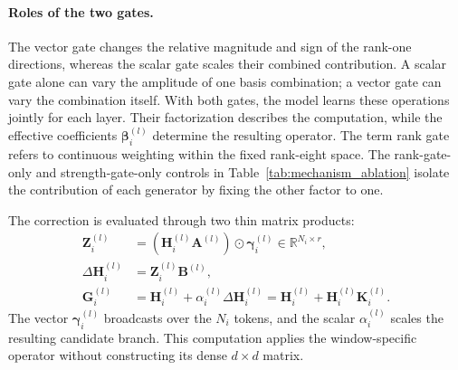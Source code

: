 \documentclass[journal]{IEEEtran}
\begin{document}
\paragraph{Roles of the two gates.}
The vector gate changes the relative magnitude and sign of the rank-one directions, whereas the scalar gate scales their combined contribution. A scalar gate alone can vary the amplitude of one basis combination; a vector gate can vary the combination itself. With both gates, the model learns these operations jointly for each layer. Their factorization describes the computation, while the effective coefficients $\boldsymbol\beta_i^{(l)}$ determine the resulting operator. The term rank gate refers to continuous weighting within the fixed rank-eight space. The rank-gate-only and strength-gate-only controls in Table~\ref{tab:mechanism_ablation} isolate the contribution of each generator by fixing the other factor to one.

The correction is evaluated through two thin matrix products:
\begin{equation}
\label{eq:candidate-correction}
\begin{aligned}
\mathbf Z_i^{(l)}&=(\mathbf H_i^{(l)}\mathbf A^{(l)})
\odot\boldsymbol\gamma_i^{(l)}\in\mathbb R^{N_i\times r},\\
\Delta\mathbf H_i^{(l)}&=\mathbf Z_i^{(l)}\mathbf B^{(l)},\\
\mathbf G_i^{(l)}&=\mathbf H_i^{(l)}
+\alpha_i^{(l)}\Delta\mathbf H_i^{(l)}
=\mathbf H_i^{(l)}+\mathbf H_i^{(l)}\mathbf K_i^{(l)}.
\end{aligned}
\end{equation}
The vector $\boldsymbol\gamma_i^{(l)}$ broadcasts over the $N_i$ tokens, and the scalar $\alpha_i^{(l)}$ scales the resulting candidate branch. This computation applies the window-specific operator without constructing its dense $d\times d$ matrix.
\end{document}

